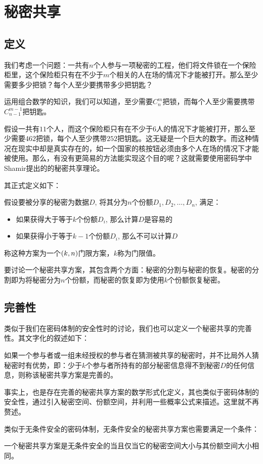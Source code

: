 \section{秘密共享}
\subsection{定义}
我们考虑一个问题：一共有$n$个人参与一项秘密的工程，他们将文件锁在一个保险柜里，这个保险柜只有在不少于$m$个相关的人在场的情况下才能被打开。那么至少需要多少把锁？每个人至少要携带多少把钥匙？\par
运用组合数学的知识，我们可以知道，至少需要$C_n^m$把锁，而每个人至少需要携带$C_{n-1}^{m-1}$把钥匙。\par
假设一共有$11$个人，而这个保险柜只有在不少于$6$人的情况下才能被打开，那么至少需要$462$把锁，每个人至少携带$252$把钥匙。这无疑是一个巨大的数字。而这种情况在现实中却是真实存在的，如一个国家的核按钮必须由多个人在场的情况下才能被使用。那么，有没有更简易的方法能实现这个目的呢？这就需要使用密码学中Shamir提出的的秘密共享理论。\par
其正式定义如下：\par
假设要被分享的秘密为数据$D$, 将其分为$n$个份额$D_1, D_2,\ldots, D_n$, 满足：
\begin{itemize}
	\item 如果获得大于等于$k$个份额$D_i$, 那么计算$D$是容易的
	\item 如果获得小于等于$k-1$个份额$D_i$, 那么不可以计算$D$
\end{itemize}

称这种方案为一个$\left( {k, n}\right)$门限方案，$k$称为门限值。\par
要讨论一个秘密共享方案，其包含两个方面：秘密的分割与秘密的恢复。秘密的分割即为将秘密分为$n$个份额，而秘密的恢复即为使用$k$个份额恢复秘密。
\subsection{完善性}
类似于我们在密码体制的安全性时的讨论，我们也可以定义一个秘密共享的完善性。其文字化的叙述如下：
\begin{Definition}
如果一个参与者或一组未经授权的参与者在猜测被共享的秘密时，并不比局外人猜秘密时有优势，即：少于$k$个参与者所持有的部分秘密信息得不到秘密$D$的任何信息，则称该秘密共享方案是完善的。
\end{Definition}

事实上，也是存在完善的秘密共享方案的数学形式化定义，其也类似于密码体制的安全性，通过引入秘密空间、份额空间，并利用一些概率公式来描述。这里就不再赘述。\par
类似于无条件安全的密码体制，无条件安全的秘密共享方案也需要满足一个条件：
\begin{theorem}
一个秘密共享方案是无条件安全的当且仅当它的秘密空间大小与其份额空间大小相同。
\end{theorem}

